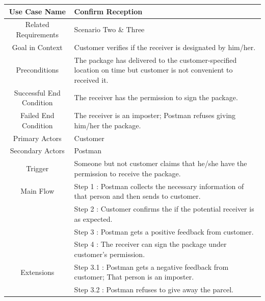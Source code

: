 \documentclass[12pt]{scrreprt}
\begin{document}
\begin{table}
  \centering
  \begin{tabular}{| c | p{11cm} |}
    \hline
    Use Case Name & Confirm Reception\\
    \hline
    Related Requirements & Scenario Two \& Three\\
    \hline
    Goal in Context & Customer verifies if the receiver is designated
    by him/her.\\
    \hline
    Preconditions & The package has delivered to the customer-specified
    location on time but customer is not convenient to received it.\\
    \hline
    Successful End Condition & The receiver has the permission to sign the
    package.\\
    \hline
    Failed End Condition & The receiver is an imposter; Postman refuses giving
    him/her the package.\\
    \hline
    Primary Actors & Customer\\
    \hline
    Secondary Actors & Postman\\
    \hline
    Trigger & Someone but not customer claims that he/she have the permission
    to receive the package.\\
    \hline
    Main Flow & Step 1 : Postman collects the necessary information of that
    person and then sends to customer.\\
    & Step 2 : Customer confirms the if the potential receiver is as expected.\\
    & Step 3 : Postman gets a positive feedback from customer.\\
    & Step 4 : The receiver can sign the package under customer's permission.\\
    \hline
    Extensions & Step 3.1 : Postman gets a negative feedback from customer;
    That person is an imposter.\\
    & Step 3.2 : Postman refuses to give away the parcel.\\
    \hline
  \end{tabular}
\end{table}
\end{document}
